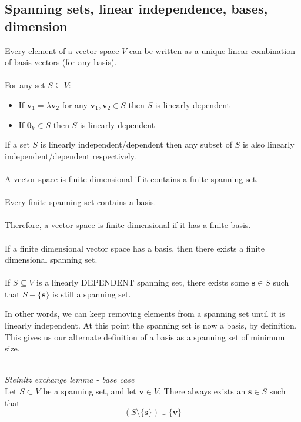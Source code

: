 \documentclass{scrartcl}
\renewcommand{\vec}[1]{\mathbf{#1}}
\begin{document}
\subsection{Spanning sets, linear independence, bases, dimension}
Every element of a vector space $ V $ can be written as a unique linear combination of basis vectors (for any basis).
\\\\
For any set $ S \subseteq V $:
\begin{itemize}
\item If $ \vec{v}_{1} = \lambda\vec{v}_{2} $ for any $ \vec{v}_{1}, \vec{v}_{2} \in S $ then $ S $ is linearly dependent
\item If $ \vec{0}_{V} \in S $ then $ S $ is linearly dependent
\end{itemize}
If a set $ S $ is linearly independent/dependent then any subset of $ S $ is also linearly independent/dependent respectively.
\\\\
A vector space is finite dimensional if it contains a finite spanning set.
\\\\
Every finite spanning set contains a basis.
\\\\
Therefore, a vector space is finite dimensional if it has a finite basis.
\\\\
If a finite dimensional vector space has a basis, then there exists a finite dimensional spanning set.
\\\\
If $ S \subseteq V $ is a linearly DEPENDENT spanning set, there exists some $ \vec{s} \in S $ such that $ S - \{\vec{s}\} $ is still a spanning set.
\\
\begin{tcolorbox}[breakable]
In other words, we can keep removing elements from a spanning set until it is linearly independent. At this point the spanning set is now a basis, by definition. This gives us our alternate definition of a basis as a spanning set of minimum size.
\end{tcolorbox}
\noindent
\\
\textit{Steinitz exchange lemma - base case}
\\
Let $ S \subset V $ be a spanning set, and let $ \vec{v} \in V $. There always exists an $ \vec{s} \in S $ such that
\begin{equation}
(S \setminus \{\vec{s}\}) \cup \{\vec{v}\}
\end{equation}
\end{document}
